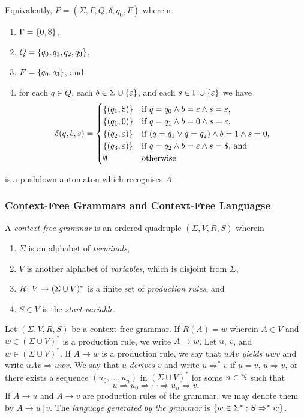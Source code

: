   \noindent Equivalently, \(P = (\Sigma, \Gamma, Q, \delta, q_0, F)\)
  wherein
  \begin{enumerate}
    \item \(\Gamma = \{0, \$\}\),
    \item \(Q = \{q_0, q_1, q_2, q_3\}\),
    \item \(F = \{q_0, q_3\}\), and
    \item for each \(q \in Q\), each \(b \in \Sigma \cup \{\varepsilon\}\), and each \(s \in \Gamma
    \cup \{\varepsilon\}\) we have
    \[
      \delta(q, b, s) = \begin{cases}
        \{(q_1, \$)\} & \text{if } q = q_0 \land b = \varepsilon \land s = \varepsilon,\\
        \{(q_1, 0)\} & \text{if } q = q_1 \land b = 0 \land s = \varepsilon,\\
        \{(q_2, \varepsilon)\} & \text{if } (q = q_1 \lor q = q_2) \land b = 1 \land s = 0,\\
        \{(q_3, \varepsilon)\} & \text{if } q = q_2 \land b = \varepsilon \land s = \$ \text{, and}\\
        \emptyset & \text{otherwise}
      \end{cases}
    \]
  \end{enumerate}
  is a pushdown automaton which recognises \(A\).
\Esl

\subsubsection{Context-Free Grammars and Context-Free Languagse}

\Bdf
  A \emph{context-free grammar} is an ordered quadruple \((\Sigma, V, R, S)\) wherein
  \begin{enumerate}
    \item \(\Sigma\) is an alphabet of \emph{terminals},
    \item \(V\) is another alphabet of \emph{variables}, which is disjoint from \(\Sigma\),
    \item \(R\colon V\to(\Sigma \cup V)^*\) is a finite set of \emph{production rules}, and
    \item \(S \in V\) is the \emph{start variable}.
  \end{enumerate}
\Edf

Let \((\Sigma, V, R, S)\) be a context-free grammar. If \(R(A) = w\) wherein \(A \in V\) and \(w \in (\Sigma \cup V)^*\)
is a production rule, we write \(A \to w\). Let \(u\), \(v\), and \(w \in (\Sigma \cup V)^*\). If \(A \to w\) is a
production rule, we say that \(u A v\) \emph{yields} \(u w v\) and write \(u A v \Rightarrow u w v\). We say that \(u\)
\emph{derives} \(v\) and write \(u \Rightarrow^* v\) if \(u = v\), \(u \Rightarrow v\), or there exists a sequence
\((u_0, \ldots, u_n)\) in \((\Sigma \cup V)^*\) for some \(n \in \mathbb{N}\) such that
\[
  u \Rightarrow u_0 \Rightarrow \cdots \Rightarrow u_n \Rightarrow v.
\]
If \(A \to u\) and \(A \to v\) are production rules of the grammar, we may denote them by \(A \to u \, | \, v\). The
\emph{language generated by the grammar} is \(\{w \in \Sigma^* : S \Rightarrow^* w\}\).

